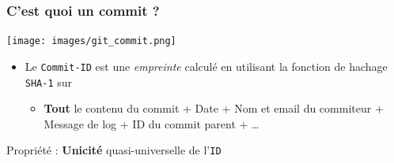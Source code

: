 \documentclass[table,tikz,12pt,svgnames]{beamer}
\begin{document}
\begin{frame}
\frametitle{C'est quoi un commit ?}
	\vspace{-1em}
	\begin{block}{}
	\begin{adjustwidth}{-0.5cm}{-0.5cm}{}
		\begin{center}	
			{\texttt{[image: images/git\_commit.png]}}
		\end{center}
	\end{adjustwidth}
	\end{block}

	\vspace{-2em}
	\begin{block}{}
	\begin{itemize}
		\item Le \texttt{Commit-ID} est une \textit{empreinte} calculé en utilisant la fonction de hachage \texttt{SHA-1} sur
		\begin{itemize}
			\item \textbf{Tout} le contenu du commit + Date + Nom et email du commiteur + Message de log + ID du commit parent + \ldots
		\end{itemize}
	\end{itemize}
	Propriété : \textbf{Unicité} quasi-universelle de l'\texttt{ID}
\end{block}
\end{frame}
\end{document}
